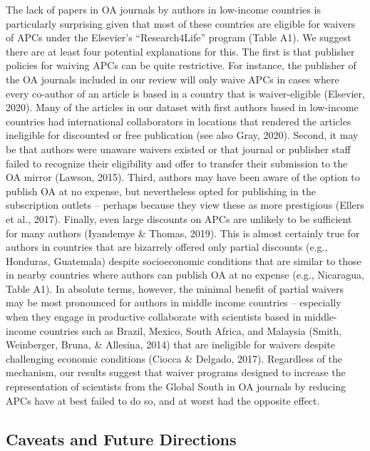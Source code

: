 \documentclass[
  english,
  man]{apa6}
\begin{document}
The lack of papers in OA journals by authors in low-income countries is particularly surprising given that most of these countries are eligible for waivers of APCs under the Elsevier's \enquote{Research4Life} program (Table A1). We suggest there are at least four potential explanations for this. The first is that publisher policies for waiving APCs can be quite restrictive. For instance, the publisher of the OA journals included in our review will only waive APCs in cases where every co-author of an article is based in a country that is waiver-eligible (Elsevier, 2020). Many of the articles in our dataset with first authors based in low-income countries had international collaborators in locations that rendered the articles ineligible for discounted or free publication (see also Gray, 2020). Second, it may be that authors were unaware waivers existed or that journal or publisher staff failed to recognize their eligibility and offer to transfer their submission to the OA mirror (Lawson, 2015). Third, authors may have been aware of the option to publish OA at no expense, but nevertheless opted for publishing in the subscription outlets -- perhaps because they view these as more prestigious (Ellers et al., 2017). Finally, even large discounts on APCs are unlikely to be sufficient for many authors (Iyandemye \& Thomas, 2019). This is almost certainly true for authors in countries that are bizarrely offered only partial discounts (e.g., Honduras, Guatemala) despite socioeconomic conditions that are similar to those in nearby countries where authors can publish OA at no expense (e.g., Nicaragua, Table A1). In absolute terms, however, the minimal benefit of partial waivers may be most pronounced for authors in middle income countries -- especially when they engage in productive collaborate with scientists based in middle-income countries such as Brazil, Mexico, South Africa, and Malaysia (Smith, Weinberger, Bruna, \& Allesina, 2014) that are ineligible for waivers despite challenging economic conditions (Ciocca \& Delgado, 2017). Regardless of the mechanism, our results suggest that waiver programs designed to increase the representation of scientists from the Global South in OA journals by reducing APCs have at best failed to do so, and at worst had the opposite effect.

\hypertarget{caveats-and-future-directions}{%
\subsection{Caveats and Future Directions}\label{caveats-and-future-directions}}
\end{document}
